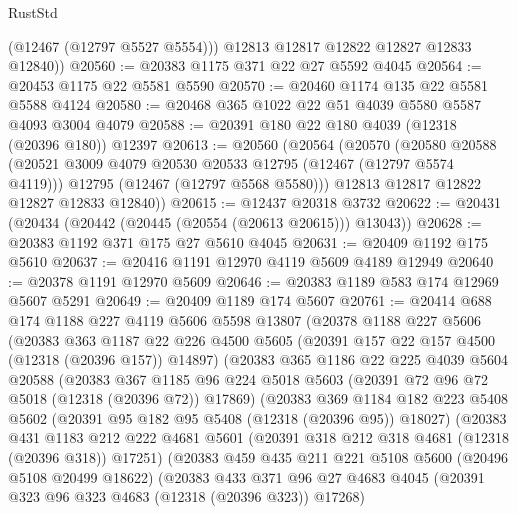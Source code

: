 \begin{lexlean}{RustStd}
\begin{coremodule}
          (@12467 (@12797 @5527 @5554)))
        @12813
        @12817
        @12822
        @12827
        @12833
        @12840))
@20560 := @20383 @1175 @371 @22 @27 @5592 @4045
@20564 := @20453 @1175 @22 @5581 @5590
@20570 := @20460 @1174 @135 @22 @5581 @5588 @4124
@20580 := @20468 @365 @1022 @22 @51 @4039 @5580 @5587 @4093 @3004 @4079
@20588 := @20391 @180 @22 @180 @4039 (@12318 (@20396 @180)) @12397
@20613 := @20560
    (@20564
      (@20570
        (@20580
          @20588
          (@20521 @3009 @4079 @20530 @20533 @12795 (@12467 (@12797 @5574 @4119)))
          @12795
          (@12467 (@12797 @5568 @5580)))
        @12813
        @12817
        @12822
        @12827
        @12833
        @12840))
@20615 := @12437 @20318 @3732
@20622 := @20431 (@20434 (@20442 (@20445 (@20554 (@20613 @20615))) @13043))
@20628 := @20383 @1192 @371 @175 @27 @5610 @4045
@20631 := @20409 @1192 @175 @5610
@20637 := @20416 @1191 @12970 @4119 @5609 @4189 @12949
@20640 := @20378 @1191 @12970 @5609
@20646 := @20383 @1189 @583 @174 @12969 @5607 @5291
@20649 := @20409 @1189 @174 @5607
@20761 := @20414
    @688
    @174
    @1188
    @227
    @4119
    @5606
    @5598
    @13807
    (@20378
      @1188
      @227
      @5606
      (@20383
        @363
        @1187
        @22
        @226
        @4500
        @5605
        (@20391 @157 @22 @157 @4500 (@12318 (@20396 @157)) @14897)
        (@20383
          @365
          @1186
          @22
          @225
          @4039
          @5604
          @20588
          (@20383
            @367
            @1185
            @96
            @224
            @5018
            @5603
            (@20391 @72 @96 @72 @5018 (@12318 (@20396 @72)) @17869)
            (@20383
              @369
              @1184
              @182
              @223
              @5408
              @5602
              (@20391 @95 @182 @95 @5408 (@12318 (@20396 @95)) @18027)
              (@20383
                @431
                @1183
                @212
                @222
                @4681
                @5601
                (@20391 @318 @212 @318 @4681 (@12318 (@20396 @318)) @17251)
                (@20383
                  @459
                  @435
                  @211
                  @221
                  @5108
                  @5600
                  (@20496 @5108 @20499 @18622)
                  (@20383
                    @433
                    @371
                    @96
                    @27
                    @4683
                    @4045
                    (@20391 @323 @96 @323 @4683 (@12318 (@20396 @323)) @17268)

\end{coremodule}
\end{lexlean}
